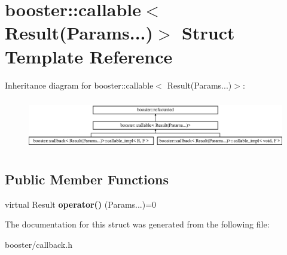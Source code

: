 \section{booster\+:\+:callable$<$ Result(Params...)$>$ Struct Template Reference}
\label{structbooster_1_1callable_3_01Result_07Params_8_8_8_08_4}
Inheritance diagram for booster\+:\+:callable$<$ Result(Params...)$>$\+:\begin{figure}[H]
\begin{center}
\leavevmode
\includegraphics[height=2.245989cm]{structbooster_1_1callable_3_01Result_07Params_8_8_8_08_4}
\end{center}
\end{figure}
\subsection*{Public Member Functions}
\begin{DoxyCompactItemize}
\item 
virtual Result {\bfseries operator()} (Params...)=0\label{structbooster_1_1callable_3_01Result_07Params_8_8_8_08_4_abed5d6565425b2e15a67a4e0e40eede7}

\end{DoxyCompactItemize}


The documentation for this struct was generated from the following file\+:\begin{DoxyCompactItemize}
\item 
booster/callback.\+h\end{DoxyCompactItemize}
